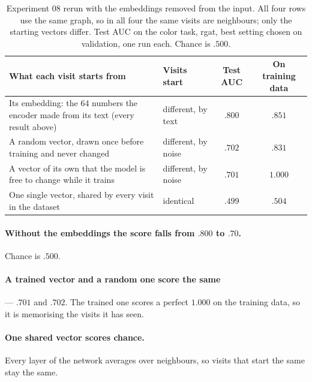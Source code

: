 \documentclass[11pt]{article}
\begin{document}
\begin{table}[h]
\centering
\begin{tabularx}{\textwidth}{Xlcc}
\toprule
What each visit starts from & Visits start & Test AUC & On training data \\
\midrule
Its embedding: the 64 numbers the encoder
made from its text (every result above) & different, by text & $\mathbf{.800}$ & $.851$ \\
A random vector, drawn once before training
and never changed & different, by noise & $.702$ & $.831$ \\
A vector of its own that the model is free
to change while it trains & different, by noise & $.701$ & $1.000$ \\
One single vector, shared by every visit
in the dataset & identical & $.499$ & $.504$ \\
\bottomrule
\end{tabularx}
\caption{Experiment 08 rerun with the embeddings removed from the input. All four rows use the
same graph, so in all four the same visits are neighbours; only the starting vectors differ.
Test AUC on the color task, rgat, best setting chosen on validation, one run each. Chance is
$.500$.}
\end{table}

\paragraph{Without the embeddings the score falls from $.800$ to $.70$.} Chance is $.500$.

\paragraph{A trained vector and a random one score the same} --- $.701$ and $.702$. The trained
one scores a perfect $1.000$ on the training data, so it is memorising the visits it has seen.

\paragraph{One shared vector scores chance.} Every layer of the network averages over
neighbours, so visits that start the same stay the same.
\end{document}
